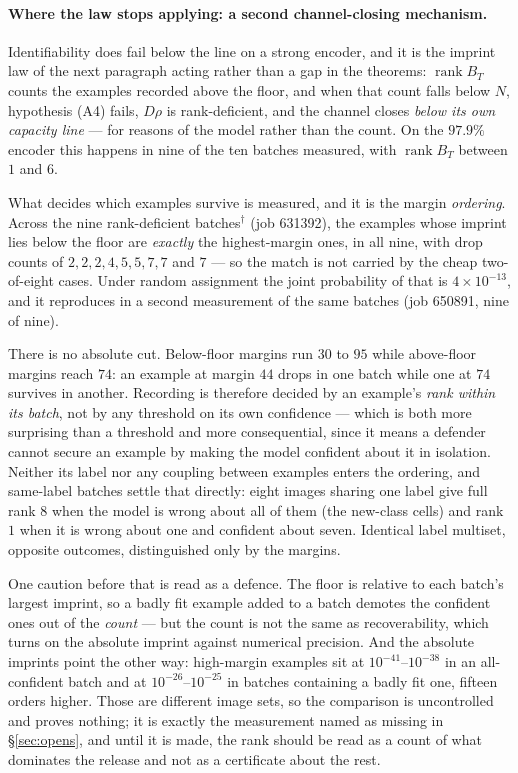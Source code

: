 \paragraph{Where the law stops applying: a second channel-closing
mechanism.} Identifiability does fail below the line on a strong encoder,
and it is the imprint law of the next paragraph acting rather than a gap in
the theorems: $\operatorname{rank}B_T$ counts the examples recorded above the
floor, and when that count falls below $N$, hypothesis (A4) fails, $D\rho$
is rank-deficient, and the channel closes \emph{below its own capacity line}
— for reasons of the model rather than the count. On the $97.9\%$ encoder
this happens in nine of the ten batches measured, with
$\operatorname{rank}B_T$ between $1$ and $6$.

What decides which examples survive is measured, and it is the margin
\emph{ordering}. Across the nine rank-deficient batches$^\dagger$ (job
631392), the examples whose imprint lies below the floor are \emph{exactly}
the highest-margin ones, in all nine, with drop counts of $2,2,2,4,5,5,7,7$
and $7$ — so the match is not carried by the cheap two-of-eight cases. Under
random assignment the joint probability of that is $4\times10^{-13}$, and it
reproduces in a second measurement of the same batches (job 650891, nine of
nine).

There is no absolute cut. Below-floor margins run $30$ to $95$ while
above-floor margins reach $74$: an example at margin $44$ drops in one batch
while one at $74$ survives in another. Recording is therefore decided by an
example's \emph{rank within its batch}, not by any threshold on its own
confidence — which is both more surprising than a threshold and more
consequential, since it means a defender cannot secure an example by making
the model confident about it in isolation. Neither its label nor any
coupling between examples enters the ordering, and same-label batches settle
that directly: eight images sharing one label give full rank $8$ when the
model is wrong about all of them (the new-class cells) and rank $1$ when it
is wrong about one and confident about seven. Identical label multiset,
opposite outcomes, distinguished only by the margins.

One caution before that is read as a defence. The floor is relative to each
batch's largest imprint, so a badly fit example added to a batch demotes the
confident ones out of the \emph{count} — but the count is not the same as
recoverability, which turns on the absolute imprint against numerical
precision. And the absolute imprints point the other way: high-margin
examples sit at $10^{-41}$--$10^{-38}$ in an all-confident batch and at
$10^{-26}$--$10^{-25}$ in batches containing a badly fit one, fifteen orders
higher. Those are different image sets, so the comparison is uncontrolled and
proves nothing; it is exactly the measurement named as missing in
\S\ref{sec:opens}, and until it is made, the rank should be read as a count
of what dominates the release and not as a certificate about the rest.

